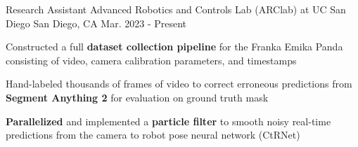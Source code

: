 

\begin{cventries}
  \cventry
    {Research Assistant}
    {Advanced Robotics and Controls Lab (ARClab) at UC San Diego}
    {San Diego, CA}
    {Mar. 2023 - Present}
    {
      \begin{cvitems}
        \item Constructed a full \textbf{dataset collection pipeline} for the Franka Emika Panda consisting of video, camera calibration parameters, and timestamps
        \item Hand-labeled thousands of frames of video to correct erroneous predictions from \textbf{Segment Anything 2} for evaluation on ground truth mask
        \item \textbf{Parallelized} and implemented a \textbf{particle filter} to smooth noisy real-time predictions from the camera to robot pose neural network (CtRNet)
      \end{cvitems}
    }


\end{cventries}
